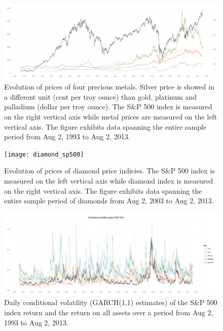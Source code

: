 \documentclass[preprint,authoryear,11pt]{elsarticle}
\begin{document}
\begin{figure}
	\centering
	\includegraphics[scale=0.3]{metal_prices}
	\caption{Evolution of prices of four precious metals. Silver price is showed in a different unit (cent per troy ounce) than gold, platinum and palladium (dollar per troy ounce). The S\&P 500 index is measured on the right vertical axis while metal prices are measured on the left vertical axis. The figure exhibits data spanning the entire sample period from Aug 2, 1993 to Aug 2, 2013.}   %
	\label{fig:metal_sp500}
\end{figure}

\begin{figure}
	\centering
	\texttt{[image: diamond\_sp500]}
	\caption{Evolution of prices of diamond price indicies. The S\&P 500 index is measured on the left vertical axis while diamond index is measured on the right vertical axis. The figure exhibits data spanning the entire sample period of diamonds from Aug 2, 2003 to Aug 2, 2013.}
	\label{fig:diamond_sp500}
\end{figure}

\begin{figure}
	\centering
	\includegraphics[scale=0.34]{sp500Plot}
	\caption{Daily conditional volatility (GARCH(1,1) estimates) of the S\&P 500 index return and the return on all assets over a period from Aug 2, 1993 to Aug 2, 2013. }
	\label{fig:sp500Plot}
\end{figure}


\end{document}

